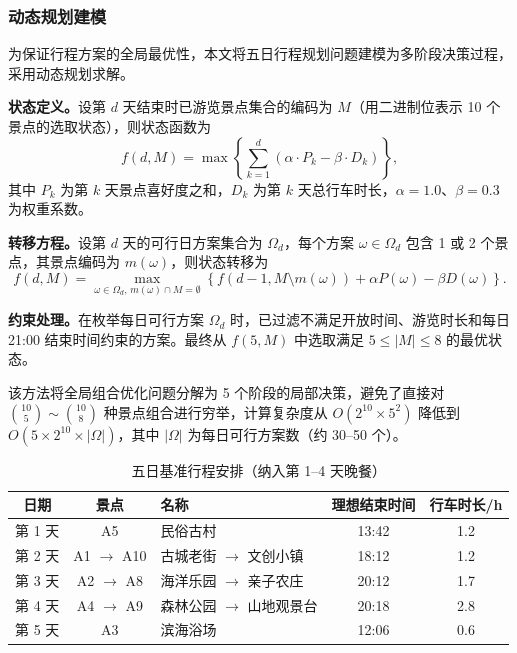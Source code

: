 
\subsubsection{动态规划建模}

为保证行程方案的全局最优性，本文将五日行程规划问题建模为多阶段决策过程，采用动态规划求解。

\textbf{状态定义。}设第 $d$ 天结束时已游览景点集合的编码为 $M$（用二进制位表示 10 个景点的选取状态），则状态函数为
\begin{equation}
f(d, M) = \max\left\{\sum_{k=1}^{d} \left(\alpha \cdot P_k - \beta \cdot D_k\right)\right\},
\end{equation}
其中 $P_k$ 为第 $k$ 天景点喜好度之和，$D_k$ 为第 $k$ 天总行车时长，$\alpha=1.0$、$\beta=0.3$ 为权重系数。

\textbf{转移方程。}设第 $d$ 天的可行日方案集合为 $\Omega_d$，每个方案 $\omega \in \Omega_d$ 包含 1 或 2 个景点，其景点编码为 $m(\omega)$，则状态转移为
\begin{equation}
f(d, M) = \max_{\omega \in \Omega_d,\, m(\omega) \cap M = \emptyset} \left\{f(d-1, M \setminus m(\omega)) + \alpha P(\omega) - \beta D(\omega)\right\}.
\end{equation}

\textbf{约束处理。}在枚举每日可行方案 $\Omega_d$ 时，已过滤不满足开放时间、游览时长和每日 21:00 结束时间约束的方案。最终从 $f(5, M)$ 中选取满足 $5 \leq |M| \leq 8$ 的最优状态。

该方法将全局组合优化问题分解为 5 个阶段的局部决策，避免了直接对 $\binom{10}{5} \sim \binom{10}{8}$ 种景点组合进行穷举，计算复杂度从 $O(2^{10} \times 5^2)$ 降低到 $O(5 \times 2^{10} \times |\Omega|)$，其中 $|\Omega|$ 为每日可行方案数（约 30--50 个）。



\begin{table}[H]
\centering
\caption{五日基准行程安排（纳入第 1--4 天晚餐）}
\label{tab:q2plan}
\begin{tabular}{ccp{3.5cm}cc}
\toprule
日期 & 景点 & 名称 & 理想结束时间 & 行车时长/h \\
\midrule
第 1 天 & A5 & 民俗古村 & 13:42 & 1.2 \\
第 2 天 & A1 $\rightarrow$ A10 & 古城老街 $\rightarrow$ 文创小镇 & 18:12 & 1.2 \\
第 3 天 & A2 $\rightarrow$ A8 & 海洋乐园 $\rightarrow$ 亲子农庄 & 20:12 & 1.7 \\
第 4 天 & A4 $\rightarrow$ A9 & 森林公园 $\rightarrow$ 山地观景台 & 20:18 & 2.8 \\
第 5 天 & A3 & 滨海浴场 & 12:06 & 0.6 \\
\bottomrule
\end{tabular}
\end{table}

